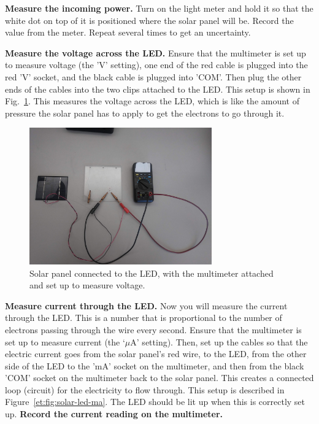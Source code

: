 \begin{steps}
	\item \textbf{Measure the incoming power.} Turn on the light meter and hold it so that the white dot on top of it is positioned where the solar panel will be. Record the value from the meter. Repeat several times to get an uncertainty.

	\item \textbf{Measure the voltage across the LED.} Ensure that the multimeter is set up to measure voltage (the 'V' setting), one end of the red cable is plugged into the red 'V' socket, and the black cable is plugged into 'COM'. Then plug the other ends of the cables into the two clips attached to the LED. This setup is shown in Fig.\ \ref{et:fig:solar-led-v}. This measures the voltage across the LED, which is like the amount of pressure the solar panel has to apply to get the electrons to go through it.
	
\begin{figure}
	\centering
	\includegraphics[width=0.7\textwidth]{energy-trans/solar-led-v}
	\caption{Solar panel connected to the LED, with the multimeter attached and set up to measure voltage.}\label{et:fig:solar-led-v}
\end{figure}

	\item \textbf{Measure current through the LED.} Now you will measure the current through the LED. This is a number that is proportional to the number of electrons passing through the wire every second. Ensure that the multimeter is set up to measure current (the `$\mu$A' setting). Then, set up the cables so that the electric current goes from the solar panel's red wire, to the LED, from the other side of the LED to the 'mA' socket on the multimeter, and then from the black 'COM' socket on the multimeter back to the solar panel. This creates a connected loop (circuit) for the electricity to flow through. This setup is described in Figure\ \ref{et:fig:solar-led-ma}. The LED should be lit up when this is correctly set up. \textbf{Record the current reading on the multimeter.}
	

\end{steps}
